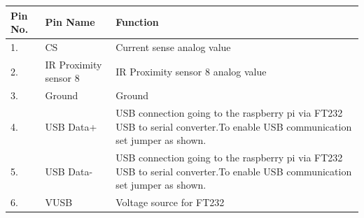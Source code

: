 \documentclass[a4paper,12pt,oneside]{book}
\begin{document}
\begin{tabular}{|p{2cm}|p{4cm}|p{10cm}|}
	\hline
\textbf{Pin No.} & \textbf{Pin Name} & \textbf{Function}\\ [0.5ex] 
\hline
1. & CS\* &Current sense analog value  \\ 
\hline
2. & IR Proximity sensor 8 &IR Proximity sensor 8 analog value  \\ 
\hline
3. &Ground &Ground  \\ 
\hline
4. &USB Data+ &USB connection going to the raspberry pi via FT232 USB to serial converter.To enable USB communication set jumper as shown.  \\ 
\hline
5. &USB Data- &USB connection going to the raspberry pi via FT232 USB to serial converter.To enable USB communication set jumper as shown. \\ 
\hline
6. &VUSB &Voltage source for FT232  \\ 
\hline

\end{tabular}
\pagebreak 
\end{document}
